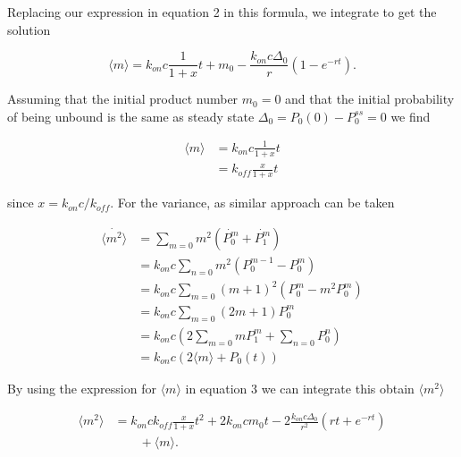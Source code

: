 Replacing our expression in equation 2 in this formula, we integrate to get the solution

\begin{equation}
\langle m \rangle = k_{on}c \frac{1}{1+x}t + m_0 - \frac{k_{on}c \Delta_0}{r}(1-e^{-rt}).
\end{equation}

Assuming that the initial product number $m_0=0$ and that the initial probability of being unbound is the same as steady state $\Delta_0 = P_0(0) - P_0^{ss} = 0$ we find

\begin{equation*}
\begin{aligned}
\langle m \rangle & = k_{on}c \frac{1}{1+x}t\\
	& = k_{off} \frac{x}{1+x}t
\end{aligned}
\end{equation*}

since $x=k_{on}c/k_{off}$. For the variance, as similar approach can be taken

\begin{equation*}
\begin{aligned}
\dot{ \langle m^2 \rangle } & = \sum_{m=0} m^2 (\dot{P_0^m} + \dot{P_1^m})\\
                          & = k_{on}c \sum_{n=0} m^2 (P_0^{m-1} - P_0^m)\\
                          & = k_{on}c \sum_{m=0} (m+1)^2 (P_0^{m} - m^2 P_0^m)\\
                          & = k_{on}c \sum_{m=0} (2m+1)P_0^{m}\\
                          & = k_{on}c (2 \sum_{m=0}mP_1^{m} + \sum_{n=0}P_0^{n})\\
                          & = k_{on}c (2 \langle m \rangle + P_0(t))
\end{aligned}
\end{equation*}

By using the expression for $\langle m \rangle$ in equation 3 we can integrate this obtain $\langle m^2 \rangle$

\begin{equation}
\begin{aligned}
\langle m^2 \rangle & = k_{on}c k_{off} \frac{x}{1+x}t^2 + 2k_{on}c m_0t - 2\frac{k_{on}c \Delta_0}{r^2}(rt+e^{-rt})\\ 
 & \qquad + \langle m \rangle.
\end{aligned}
\end{equation}

